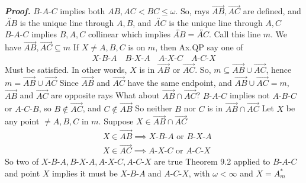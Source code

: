 \documentclass{report}
\begin{document}
\begin{itemize}
            \textbf{\textit{Proof.}} $ B\text{-}A\text{-}C$ implies both $AB,AC  < BC \leq \omega$. So, rays $\overrightarrow{AB}, \overrightarrow{AC}$ are defined, and $\overleftrightarrow{AB}$ is the unique line through $A,B$, and $\overleftrightarrow{AC}$ is the unique line through $A,C$
            \bigbreak \noindent 
            $ B\text{-}A\text{-}C$ implies $B,A,C$ collinear which implies $ \overleftrightarrow{AB} = \overleftrightarrow{AC}$. Call this line $m$.
            \bigbreak \noindent 
            We have $\overrightarrow{AB}, \overrightarrow{AC} \subseteq m$
            \bigbreak \noindent 
            If $X \ne A,B,C$ is on $m$, then Ax.QP say one of 
            \begin{align*}
                X\text{-}B\text{-}A \quad B\text{-}X\text{-}A \quad A\text{-}X\text{-}C \quad A\text{-}C\text{-}X
            \end{align*}
            Must be satisfied. In other words, $X$ is in $\overrightarrow{AB}$ or $\overrightarrow{AC}$. So, $m \subseteq \overrightarrow{AB}  \cup \overrightarrow{AC}$, hence $ m = \overrightarrow{AB} \cup \overrightarrow{AC} $
            \bigbreak \noindent 
            Since $\overrightarrow{AB}$ and $\overrightarrow{AC}$ have the same endpoint, and $\overrightarrow{AB} \cup \overrightarrow{AC}  = m $, $\overrightarrow{AB}$ and $\overrightarrow{AC} $ are opposite rays
            \bigbreak \noindent 
            What about $\overrightarrow{AB} \cap \overrightarrow{AC}$? $ B\text{-}A\text{-}C$ implies not $ A\text{-}B\text{-}C$ or $ A\text{-}C\text{-}B$, so $B \not\in \overrightarrow{AC}$, and $C \not\in \overrightarrow{AB}$
            \bigbreak \noindent 
            So neither $B$ nor $C$ is in $\overrightarrow{AB} \cap \overrightarrow{AC}$
            \bigbreak \noindent 
            Let $X$ be any point $\ne A,B,C$ in $m$. Suppose $X \in \overrightarrow{AB} \cap \overrightarrow{AC}$
            \begin{align*}
                &X \in \overrightarrow{AB} \implies X\text{-}B\text{-}A \text{ or } B\text{-}X\text{-}A \\
                &X \in \overrightarrow{AC} \implies A\text{-}X\text{-}C \text{ or } A\text{-}C\text{-}X
            \end{align*}
            So two of $ X\text{-}B\text{-}A, B\text{-}X\text{-}A, A\text{-}X\text{-}C, A\text{-}C\text{-}X$ are true
            \bigbreak \noindent 
            Theorem 9.2 applied to $ B\text{-}A\text{-}C$ and point $X$ implies it must be $ X\text{-}B\text{-}A$ and $ A\text{-}C\text{-}X$, with $\omega < \infty$ and $ X = A_{m}^{*}$

\end{itemize}
\end{document}
